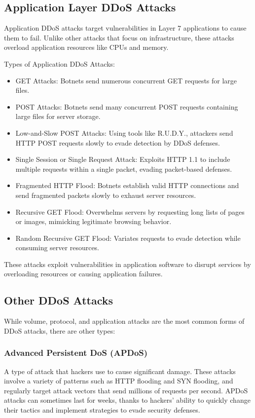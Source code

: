 \documentclass[a4paper, 12pt]{report} %
\begin{document}
        \subsection{Application Layer DDoS Attacks}
        Application DDoS attacks target vulnerabilities in Layer 7 applications to cause them to fail. Unlike other attacks that focus on infrastructure, these attacks overload application resources like CPUs and memory.

        Types of Application DDoS Attacks:
        
        \begin{itemize}
            \item GET Attacks: Botnets send numerous concurrent GET requests for large files.
            \item POST Attacks: Botnets send many concurrent POST requests containing large files for server storage.
            \item Low-and-Slow POST Attacks: Using tools like R.U.D.Y., attackers send HTTP POST requests slowly to evade detection by DDoS defenses.
            \item Single Session or Single Request Attack: Exploits HTTP 1.1 to include multiple requests within a single packet, evading packet-based defenses.
            \item Fragmented HTTP Flood: Botnets establish valid HTTP connections and send fragmented packets slowly to exhaust server resources.
            \item Recursive GET Flood: Overwhelms servers by requesting long lists of pages or images, mimicking legitimate browsing behavior.
            \item Random Recursive GET Flood: Variates requests to evade detection while consuming server resources.
        \end{itemize}

        These attacks exploit vulnerabilities in application software to disrupt services by overloading resources or causing application failures.

        \subsection{Other DDoS Attacks}
        While volume, protocol, and application attacks are the most common forms of DDoS attacks, there are other types:

            \subsubsection{Advanced Persistent DoS (APDoS)}
            A type of attack that hackers use to cause significant damage. These attacks involve a variety of patterns such as HTTP flooding and SYN flooding, and regularly target attack vectors that send millions of requests per second. APDoS attacks can sometimes last for weeks, thanks to hackers’ ability to quickly change their tactics and implement strategies to evade security defenses.
\end{document}
